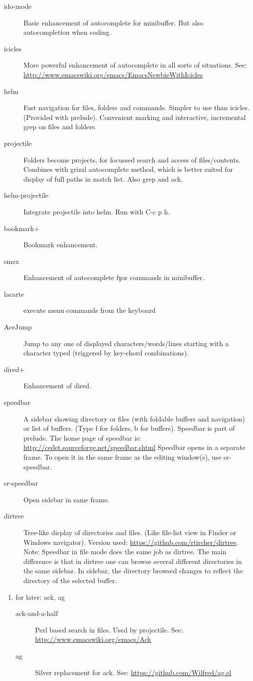 \documentclass{article}
\begin{document}
\begin{description}
\item[{ido-mode}] Basic enhancement of autocomplete for minibuffer.
But also autocompletion when coding.
\item[{icicles}] More powerful enhancement of autocomplete in all sorts of situations.
See: \url{http://www.emacswiki.org/emacs/EmacsNewbieWithIcicles}
\item[{helm}] Fast navigation for files, folders and commands.  Simpler to use than icicles. (Provided with prelude).  Convenient marking and interactive, incremental grep on files and folders.
\item[{projectile}] Folders become projects, for focussed search and access of files/contents.  Combines with grizzl autocomplete method, which is better suited for display of full paths in match list.  Also grep
and ack.
\item[{helm-projectile}] Integrate projectile into helm.  Run with C-c p h.
\item[{bookmark+}] Bookmark enhancement.
\item[{smex}] Enhancement of autocomplete fγor commands in minibuffer.
\item[{lacarte}] execute menu commands from the keyboard
\item[{AceJump}] Jump to any one of displayed characters/words/lines starting with a character typed (triggered by key-chord combinations).
\item[{dired+}] Enhancement of dired.
\item[{speedbar}] A sidebar showing directory or files (with foldable buffers and navigation) or list of buffers. (Type f for folders, b for buffers).
Speedbar is part of prelude.  The home page of speedbar is: \url{http://cedet.sourceforge.net/speedbar.shtml}
Speedbar opens in a separate frame.  To open it in the same frame as the editing window(s), use sr-speedbar.
\item[{sr-speedbar}] Open sidebar in same frame.
\item[{dirtree}] Tree-like display of directories and files.  (Like file-list view in Finder or Windows navigator).  Version used:  \url{https://github.com/rtircher/dirtree}.
Note: Speedbar in file mode does the same job as dirtree.  The main difference is that in dirtree one can browse several different directories in the same sidebar.  In sidebar, the directory browsed changes to reflect the directory of the selected buffer.
\end{description}
\begin{enumerate}
\item for later: ack, ag
\label{sec-1-1-3-1}
\begin{description}
\item[{ack-and-a-half}] Perl based search in files.  Used by projectile.  See:
\url{http://www.emacswiki.org/emacs/Ack}
\item[{ag}] Silver replacement for ack.  See:
\url{https://github.com/Wilfred/ag.el}
\end{description}
\end{enumerate}
\end{document}
